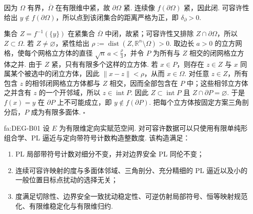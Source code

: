 \begin{FAProof}
因为 \(\displaystyle\Omega\) 有界，\(\displaystyle\overline\Omega\) 在有限维中紧，故 \(\displaystyle\partial\Omega\) 紧. 连续像 \(\displaystyle f(\partial\Omega)\) 紧，因此闭. 可容许性给出 \(\displaystyle y\notin f(\partial\Omega)\)，所以点到该闭集合的距离严格为正，即 \(\displaystyle\delta_{\partial}>0\).

集合 \(\displaystyle Z=f^{-1}(\{y\})\) 在紧集合 \(\displaystyle\overline\Omega\) 中闭，故紧；可容许性又排除 \(\displaystyle Z\cap\partial\Omega\)，所以 \(\displaystyle Z\subset\Omega\). 若 \(\displaystyle Z\neq\varnothing\)，紧性给出
\(\displaystyle \rho:=\operatorname{dist}(Z,\mathbb R^n\setminus\Omega)>0.\)
取边长 \(\displaystyle a>0\) 的立方网格，使每个网格立方体的直径 \(\displaystyle\sqrt n\,a<\frac{\rho}{3}\)，并令 \(\displaystyle P\) 为所有与 \(\displaystyle Z\) 相交的闭网格立方体之并. 由于 \(\displaystyle Z\) 紧，只有有限多个这样的立方体. 若 \(\displaystyle x\in P\)，则存在 \(\displaystyle z\in Z\) 与 \(\displaystyle x\) 同属某个被选中的闭立方体，因此 \(\displaystyle\|x-z\|<\rho\)，从而 \(\displaystyle x\in\Omega\). 对任意 \(\displaystyle z\in Z\)，所有包含 \(\displaystyle z\) 的相邻闭网格立方体都与 \(\displaystyle Z\) 相交，因而全部包含在 \(\displaystyle P\) 中；这些相邻立方体之并含有 \(\displaystyle z\) 的一个开邻域，所以 \(\displaystyle z\in\operatorname{int}P\). 因此 \(\displaystyle Z\subset\operatorname{int}P\) 且 \(\displaystyle Z\cap\partial P=\varnothing\). 于是 \(\displaystyle f(x)=y\) 在 \(\displaystyle\partial P\) 上不可能成立，即 \(\displaystyle y\notin f(\partial P)\). 把每个立方体按固定方案三角剖分后，\(\displaystyle P\) 成为有限多面体. \hfill\(\square\)
\end{FAProof}

\begin{FATheorem}{fa:DEG-B01}
设 \(\displaystyle E\) 为有限维定向实赋范空间. 对可容许数据可以只使用有限单纯形组合学、PL 逼近与定向带符号计数构造整数度. 该构造满足：

\begin{enumerate}
\item PL 局部带符号计数对细分不变，并对边界安全 PL 同伦不变；
\item 连续可容许映射的度与多面体邻域、三角剖分、充分精细的 PL 逼近以及小的一般位置目标点扰动的选择无关；
\item 度满足切除性、边界安全一致扰动稳定性、可逆仿射局部符号、恒等映射规范化、有限维稳定化与有限维归约.
\end{enumerate}
\end{FATheorem}

